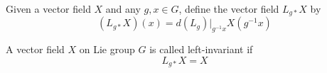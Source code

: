 \begin{remark}
	Given a vector field $X$ and any $g, x \in G$, define the vector field $L_{g*} X$ by
	$$
		(L_{g*} X)(x) = d(L_g)\vert_{g^{-1} x} X(g^{-1}x)
	$$
\end{remark}

\begin{definition}
	A vector field $X$ on Lie group $G$ is called left-invariant if
	$$
		L_{g*} X = X
	$$
\end{definition}
